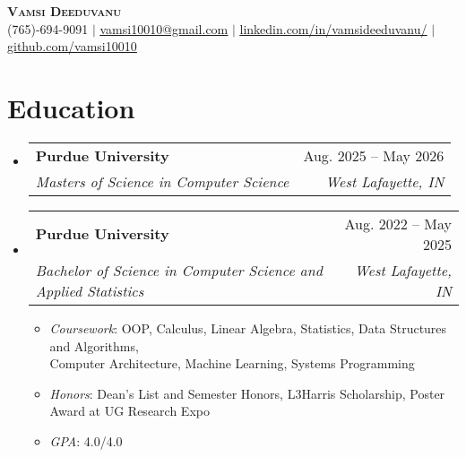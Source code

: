 \documentclass[letterpaper,11pt]{article}
\makeatletter
\newcommand{\resumeItem}[1]{
  \item\small{
    {#1 \vspace{-2pt}}
  }
}
\newcommand{\resumeSubheading}[4]{
  \vspace{-2pt}\item
    \begin{tabular*}{0.97\textwidth}[t]{l@{\extracolsep{\fill}}r}
      \textbf{\small#1} & \small#2 \\
      \textit{\small#3} & \textit{\small #4} \\
    \end{tabular*}\vspace{-7pt}
}
\newcommand{\resumeSubHeadingListStart}{\begin{itemize}[leftmargin=0.15in, label={}]}
\newcommand{\resumeSubHeadingListEnd}{\end{itemize}}
\newcommand{\resumeItemListStart}{\begin{itemize}}
\newcommand{\resumeItemListEnd}{\end{itemize}\vspace{-5pt}}
\makeatother
\begin{document}
\begin{center}
    \textbf{\Huge \scshape Vamsi Deeduvanu} \\ \vspace{1pt}
    \small (765)-694-9091 $|$ \href{mailto:vamsi10010@gmail.com}{\underline{vamsi10010@gmail.com}} $|$ 
    \href{https://www.linkedin.com/in/vamsideeduvanu}{\underline{linkedin.com/in/vamsideeduvanu/}} $|$
    \href{https://github.com/vamsi10010}{\underline{github.com/vamsi10010}}
\end{center}



\section{Education}
  \resumeSubHeadingListStart
    \resumeSubheading
      {Purdue University}{Aug. 2025 -- May 2026}
      {Masters of Science in Computer Science}{West Lafayette, IN}
    \resumeSubheading
      {Purdue University}{Aug. 2022 -- May 2025}
      {Bachelor of Science in Computer Science and Applied Statistics}{West Lafayette, IN}
      \resumeItemListStart
        \resumeItem{\textit{Coursework}: OOP, Calculus, Linear Algebra, Statistics, Data Structures and Algorithms, \\Computer Architecture,
        Machine Learning, Systems Programming
        }
        \resumeItem{\textit{Honors}: Dean's List and Semester Honors, L3Harris Scholarship, Poster Award at UG Research Expo}
        \resumeItem{\textit{GPA}: 4.0/4.0}
      \resumeItemListEnd
  \resumeSubHeadingListEnd


\end{document}
